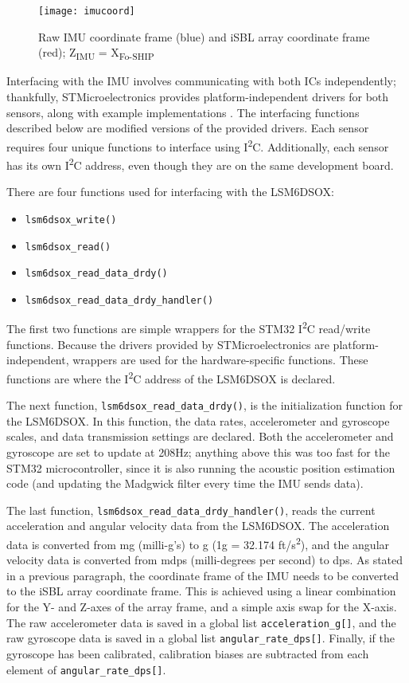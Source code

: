 \documentclass[11pt]{ucthesisCP}
\begin{document}
\begin{figure}[htbp]
	\centering
	\texttt{[image: imucoord]}
	\caption{Raw IMU coordinate frame (blue) and iSBL array coordinate frame (red); Z\textsubscript{IMU} = X\textsubscript{Fo-SHIP}}
	\label{fig:imucoord}
\end{figure}

Interfacing with the IMU involves communicating with both ICs independently; thankfully, STMicroelectronics provides platform-independent drivers for both sensors, along with example implementations \cite{lis3mdl_st} \cite{lsm6dsox_st}. The interfacing functions described below are modified versions of the provided drivers. Each sensor requires four unique functions to interface using I\textsuperscript{2}C. Additionally, each sensor has its own I\textsuperscript{2}C address, even though they are on the same development board.

There are four functions used for interfacing with the LSM6DSOX:
\begin{itemize}[noitemsep,topsep=0pt,]
	\item \verb|lsm6dsox_write()|
	\item \verb|lsm6dsox_read()|
	\item \verb|lsm6dsox_read_data_drdy()|
	\item \verb|lsm6dsox_read_data_drdy_handler()|
\end{itemize}

The first two functions are simple wrappers for the STM32 I\textsuperscript{2}C read/write functions. Because the drivers provided by STMicroelectronics are platform-independent, wrappers are used for the hardware-specific functions. These functions are where the I\textsuperscript{2}C address of the LSM6DSOX is declared.

The next function, \verb|lsm6dsox_read_data_drdy()|, is the initialization function for the LSM6DSOX. In this function, the data rates, accelerometer and gyroscope scales, and data transmission settings are declared. Both the accelerometer and gyroscope are set to update at 208Hz; anything above this was too fast for the STM32 microcontroller, since it is also running the acoustic position estimation code (and updating the Madgwick filter every time the IMU sends data). 

The last function, \verb|lsm6dsox_read_data_drdy_handler()|, reads the current acceleration and angular velocity data from the LSM6DSOX. The acceleration data is converted from mg (milli-g’s) to g (1g = 32.174 ft/s\textsuperscript{2}), and the angular velocity data is converted from mdps (milli-degrees per second) to dps. As stated in a previous paragraph, the coordinate frame of the IMU needs to be converted to the iSBL array coordinate frame. This is achieved using a linear combination for the Y- and Z-axes of the array frame, and a simple axis swap for the X-axis. The raw accelerometer data is saved in a global list \verb|acceleration_g[]|, and the raw gyroscope data is saved in a global list \verb|angular_rate_dps[]|. Finally, if the gyroscope has been calibrated, calibration biases are subtracted from each element of \verb|angular_rate_dps[]|.
\end{document}
